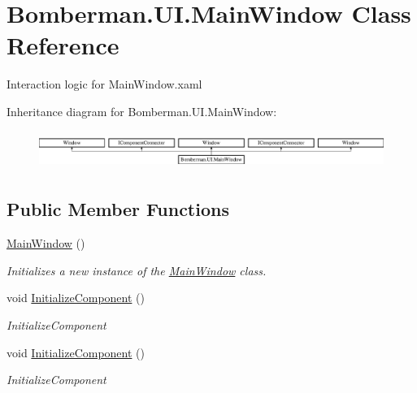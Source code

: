 \hypertarget{class_bomberman_1_1_u_i_1_1_main_window}{}\section{Bomberman.\+U\+I.\+Main\+Window Class Reference}
\label{class_bomberman_1_1_u_i_1_1_main_window}


Interaction logic for Main\+Window.\+xaml  


Inheritance diagram for Bomberman.\+U\+I.\+Main\+Window\+:\begin{figure}[H]
\begin{center}
\leavevmode
\includegraphics[height=1.265537cm]{class_bomberman_1_1_u_i_1_1_main_window}
\end{center}
\end{figure}
\subsection*{Public Member Functions}
\begin{DoxyCompactItemize}
\item 
\mbox{\hyperlink{class_bomberman_1_1_u_i_1_1_main_window_adb37602062e82ec48718bd3b33c17e69}{Main\+Window}} ()
\begin{DoxyCompactList}\small\item\em Initializes a new instance of the \mbox{\hyperlink{class_bomberman_1_1_u_i_1_1_main_window}{Main\+Window}} class. \end{DoxyCompactList}\item 
void \mbox{\hyperlink{class_bomberman_1_1_u_i_1_1_main_window_a0f7a080ed9fcbfcbada10623f1f64505}{Initialize\+Component}} ()
\begin{DoxyCompactList}\small\item\em Initialize\+Component \end{DoxyCompactList}\item 
void \mbox{\hyperlink{class_bomberman_1_1_u_i_1_1_main_window_a0f7a080ed9fcbfcbada10623f1f64505}{Initialize\+Component}} ()
\begin{DoxyCompactList}\small\item\em Initialize\+Component \end{DoxyCompactList}\end{DoxyCompactItemize}
